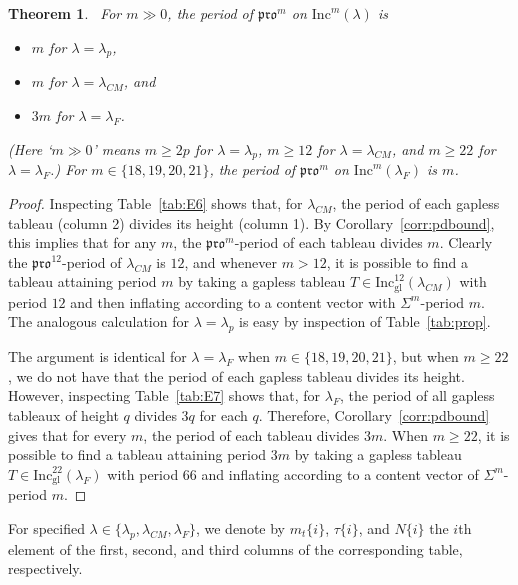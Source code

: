 \documentclass[12pt]{amsart}
\newtheorem{theorem}{Theorem}[section]
\theoremstyle{definition}
\theoremstyle{remark}
\numberwithin{equation}{section}
\newcommand{\inc}{\ensuremath{\mathrm{Inc}}}
\newcommand{\incgl}{\inc_{\mathrm{gl}}}
\newcommand{\pro}{\mathfrak{pro}}
\begin{document}
\begin{theorem}~\label{thm:actualpdbound}
For $m \gg 0$, the period of $\pro^m$ on $\inc^m(\lambda)$ is 
\begin{itemize}
\item $m$ for $\lambda = \lambda_p$, 
\item $m$ for $\lambda = \lambda_{CM}$, and 
\item $3m$ for $\lambda = \lambda_F$. 
\end{itemize}
(Here `$m \gg 0$' means $m \geq 2p$ for $\lambda = \lambda_p$, $m \geq 12$ for $\lambda = \lambda_{CM}$, and $m \geq 22$ for $\lambda = \lambda_F$.) For $m \in \lbrace 18,19,20, 21 \rbrace$, the period of $\pro^m$ on $\inc^m(\lambda_F)$ is $m$.
\end{theorem}
\begin{proof}
Inspecting Table~\ref{tab:E6} shows that, for $\lambda_{CM}$, the period of each gapless tableau (column 2) divides its height (column 1). By Corollary~\ref{corr:pdbound}, this implies that for any $m$, the $\pro^m$-period of each tableau divides $m$. Clearly the $\pro^{12}$-period of $\lambda_{CM}$ is $12$, and whenever $m> 12$, it is possible to find a tableau attaining period $m$ by taking a gapless tableau $T \in \incgl^{12}(\lambda_{CM})$ with period $12$ and then inflating according to a content vector with $\Sigma^m$-period $m$. The analogous calculation for $\lambda = \lambda_p$ is easy by inspection of Table~\ref{tab:prop}.

The argument is identical for $\lambda = \lambda_F$ when $m \in \lbrace 18,19,20, 21 \rbrace$, but when $m \geq 22$, we do not have that the period of each gapless tableau divides its height. However, inspecting Table~\ref{tab:E7} shows that, for $\lambda_F$, the period of all gapless tableaux of height $q$ divides $3q$ for each $q$. Therefore, Corollary~\ref{corr:pdbound} gives that for every $m$, the period of each tableau divides $3m$. When $m \geq 22$, it is possible to find a tableau attaining period $3m$ by taking a gapless tableau  $T \in \incgl^{22}(\lambda_F)$ with period $66$ and inflating according to a content vector of $\Sigma^m$-period $m$.


\end{proof}


For specified $\lambda \in \{\lambda_p, \lambda_{CM}, \lambda_F\}$, we denote by $m_t\{i\}$, $\tau\{i\}$, and $N\{i\}$ the $i$th element of the first, second, and third columns of the corresponding table, respectively. 
\-\ \\ \-\
\end{document}
